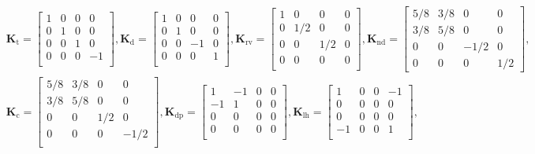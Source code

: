 \documentclass[journal]{IEEEtran}
\begin{document}
\begin{figure}
\[
\begin{split}
&\bm K_{\text{t}} =
\begin{bmatrix}
1 & 0 & 0 & 0\\
0 & 1 & 0 & 0\\
0 & 0 & 1 & 0\\
0 & 0 & 0 & -1\\
\end{bmatrix},
%
\bm K_{\text{d}} =
\begin{bmatrix}
1 & 0 & 0 & 0\\
0 & 1 & 0 & 0\\
0 & 0 & -1 & 0\\
0 & 0 & 0 & 1\\
\end{bmatrix},
%
\bm K_{\text{rv}} =
\begin{bmatrix}
1 & 0 & 0 & 0\\
0 & 1/2 & 0 & 0\\
0 & 0 & 1/2 & 0\\
0 & 0 & 0 & 0\\
\end{bmatrix},
%
\bm K_{\text{nd}} =
\begin{bmatrix}
5/8 & 3/8 & 0 & 0\\
3/8 & 5/8 & 0 & 0\\
0 & 0 & -1/2 & 0\\
0 & 0 & 0 & 1/2
\end{bmatrix},\\
%
&\bm K_{\text{c}} =
\begin{bmatrix}
5/8 & 3/8 & 0 & 0\\
3/8 & 5/8 & 0 & 0\\
0 & 0 & 1/2 & 0\\
0 & 0 & 0 & -1/2\\
\end{bmatrix},
%
\bm K_\text{dp}=
\begin{bmatrix}
1 & -1 & 0 & 0\\
-1 & 1 & 0 & 0\\
0 & 0 & 0 & 0\\
0 & 0 & 0 & 0\\
\end{bmatrix},
%
 \bm K_{\text{lh}}=
\begin{bmatrix}
1 & 0 & 0 & -1\\
0 & 0 & 0 & 0\\
0 & 0 & 0 & 0\\
-1 & 0 & 0 & 1\\
\end{bmatrix},

\end{split}\]
\end{figure}
\end{document}
